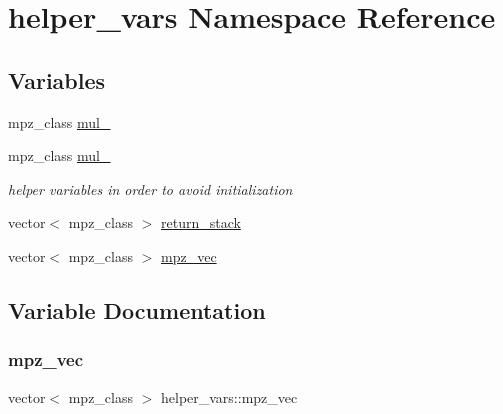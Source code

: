 \hypertarget{namespacehelper__vars}{}\section{helper\+\_\+vars Namespace Reference}
\label{namespacehelper__vars}
\subsection*{Variables}
\begin{DoxyCompactItemize}
\item 
mpz\+\_\+class \hyperlink{namespacehelper__vars_af190146bcb041e9501bb622fd0a70e1e}{mul\+\_}
\item 
mpz\+\_\+class \hyperlink{namespacehelper__vars_a3ef4720a3a8f70853c651c0bba5107b2}{mul\+\_}
\begin{DoxyCompactList}\small\item\em helper variables in order to avoid initialization \end{DoxyCompactList}\item 
vector$<$ mpz\+\_\+class $>$ \hyperlink{namespacehelper__vars_a6d2100c373830cacd232319a9958652d}{return\+\_\+stack}
\item 
vector$<$ mpz\+\_\+class $>$ \hyperlink{namespacehelper__vars_a54af4d4cefd8ae34c16c2b89992da473}{mpz\+\_\+vec}
\end{DoxyCompactItemize}


\subsection{Variable Documentation}
\mbox{\label{namespacehelper__vars_a54af4d4cefd8ae34c16c2b89992da473}} 
\subsubsection{\texorpdfstring{mpz\+\_\+vec}{mpz\_vec}}
{\footnotesize\ttfamily vector$<$ mpz\+\_\+class $>$ helper\+\_\+vars\+::mpz\+\_\+vec}

\mbox{\label{namespacehelper__vars_af190146bcb041e9501bb622fd0a70e1e}} 
